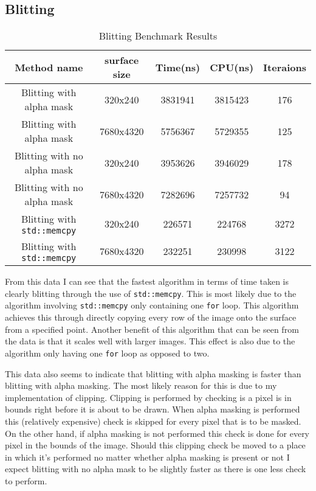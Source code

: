 \documentclass[
	letterpaper, %
	10pt, %
]{CSUniSchoolLabReport}
\begin{document}
\subsection{Blitting}
\begin{table}[ht]
	\caption{Blitting Benchmark Results} %
	\centering 
	\begin{tabular}{c c c c c} 
	\hline
	Method name & surface size & Time(ns) & CPU(ns) & Iteraions \\ [0.5ex] 
	\hline
	Blitting with alpha mask & 320x240 & 3831941 & 3815423 & 176 \\ 
	Blitting with alpha mask & 7680x4320 & 5756367 & 5729355 & 125 \\
	Blitting with no alpha mask & 320x240 & 3953626 & 3946029 & 178 \\
	Blitting with no alpha mask & 7680x4320 & 7282696 & 7257732 & 94 \\
	Blitting with \verb|std::memcpy| & 320x240 & 226571 & 224768 & 3272 \\ 
	Blitting with \verb|std::memcpy| & 7680x4320 & 232251 & 230998 & 3122 \\[1ex] 
	\end{tabular}
\end{table}
\begin{flushleft}
	From this data I can see that the fastest algorithm in terms of time taken is 
	clearly blitting through the use of \verb|std::memcpy|. This is most likely due
	to the algorithm involving \verb|std::memcpy| only containing one \verb|for| loop.
	This algorithm achieves this through directly copying every row of the image onto
	the surface from a specified point. Another benefit of this algorithm that can be seen from 
	the data is that it scales well with larger images. This effect is also due to the algorithm
	only having one \verb|for| loop as opposed to two.
\end{flushleft}
\begin{flushleft}
	This data also seems to indicate that blitting with alpha masking is faster than
	blitting with alpha masking. The most likely reason for this is due to my implementation 
	of clipping. Clipping is performed by checking is a pixel is in bounds right before it
	is about to be drawn. When alpha masking is performed this (relatively expensive) check 
	is skipped for every pixel that is to be masked. On the other hand, if alpha masking is not 
	performed this check is done for every pixel in the bounds of the image. Should this clipping 
	check be moved to a place in which it's performed no matter whether alpha masking is present or not
	I expect blitting with no alpha mask to be slightly faster as there is one less check to perform.
\end{flushleft}
\end{document}
